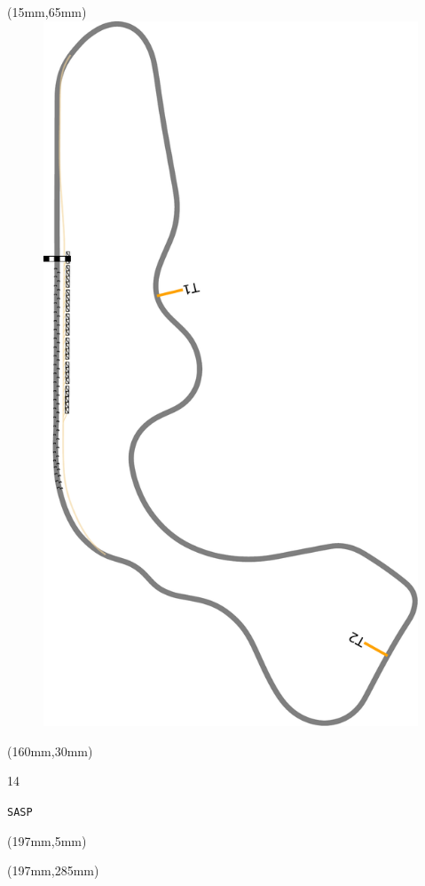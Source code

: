 \begin{textblock*}{185mm}(15mm,65mm)%
\centering
\mbox{\includegraphics[width=185mm,height=210mm,keepaspectratio]{PT/SASP.pdf}}
\end{textblock*}
\begin{textblock*}{40mm}(160mm,30mm)%
\Large
\par{} 
\par14 
\par\hfill\tiny\tt SASP\\
\end{textblock*}
\begin{textblock*}{20mm}(197mm,5mm)%
\fbox{\thepage}
\label{SASP}
\end{textblock*}
\begin{textblock*}{20mm}(197mm,285mm)%
\fbox{\thepage}
\end{textblock*}

